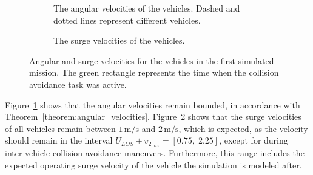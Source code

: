 \begin{figure}[htbp]
    \centering
    \begin{subfigure}[t]{\textwidth}
    \centering
    \setlength{}
    \setlength\figureheight{4cm}
    
    \vspace*{-3mm}
    \caption{The angular velocities of the vehicles. Dashed and dotted lines represent different vehicles.}
    \label{fig:angular_velocities}
    \end{subfigure}
    \begin{subfigure}[t]{\textwidth}
    \centering
    \setlength{}
    \setlength\figureheight{4cm}
    
    \vspace*{-3mm}
    \caption{The surge velocities of the vehicles.}
    \label{fig:surge_velocities}
    \end{subfigure}
    \caption{Angular and surge velocities for the vehicles in the first simulated mission. The green rectangle represents the time when the collision avoidance task was active.}
    \label{fig:velocities}
\end{figure}


Figure~\ref{fig:angular_velocities} shows that the angular velocities remain bounded, in accordance with Theorem~\ref{theorem:angular_velocities}. Figure~\ref{fig:surge_velocities} shows that the surge velocities of all vehicles remain between $1\, \mathrm{m/s}$ and $2\, \mathrm{m/s}$, which is expected, as the velocity should remain in the interval $U_{LOS} \pm v_{2_{\max}} = [0.75, \; 2.25]$, except for during inter-vehicle collision avoidance maneuvers. Furthermore, this range includes the expected operating surge velocity of the vehicle the simulation is modeled after.

%     
%     

